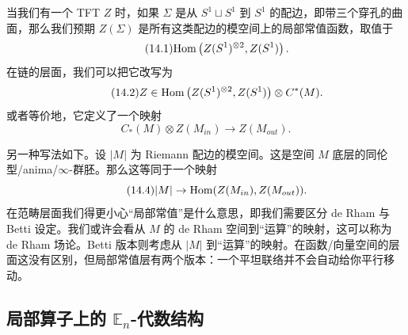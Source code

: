 当我们有一个 TFT $Z$ 时，如果 $\Sigma$ 是从 $S^1\sqcup S^1$ 到 $S^1$ 的配边，即带三个穿孔的曲面，那么我们预期 $Z(\Sigma)$ 是所有这类配边的模空间上的局部常值函数，取值于
\begin{equation}\tag{14.1}
\mathrm{Hom}\left(Z(S^1)^{\otimes2},Z(S^1)\right).
\end{equation}
在链的层面，我们可以把它改写为
\begin{equation}\tag{14.2}
Z\in\mathrm{Hom}\left(Z(S^1)^{\otimes2},Z(S^1)\right)\otimes C^*(M).
\end{equation}
或者等价地，它定义了一个映射
\begin{equation}\tag{14.3}
C_*(M)\otimes Z(M_{in})\to Z(M_{out}).
\end{equation}

另一种写法如下。设 $|M|$ 为 Riemann 配边的模空间。这是空间 $M$ 底层的同伦型/anima/$\infty$-群胚。那么这等同于一个映射
\begin{equation}\tag{14.4}
|M|\to\mathrm{Hom}(Z(M_{in}),Z(M_{out})).
\end{equation}
在范畴层面我们得更小心“局部常值”是什么意思，即我们需要区分 de Rham 与 Betti 设定。我们或许会看从 $M$ 的 de Rham 空间到“运算”的映射，这可以称为 de Rham 场论。Betti 版本则考虑从 $|M|$ 到“运算”的映射。在函数/向量空间的层面这没有区别，但局部常值层有两个版本：一个平坦联络并不会自动给你平行移动。

\subsection{局部算子上的 $\mathbb{E}_n$-代数结构}\label{sec:14-1-1}

